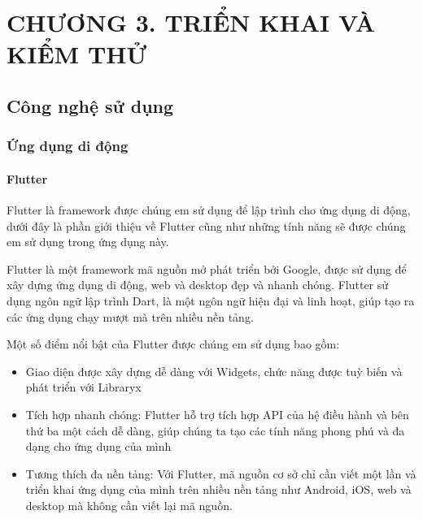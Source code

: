 
\section*{CHƯƠNG 3. TRIỂN KHAI VÀ KIỂM THỬ}
\setcounter{section}{3}
\setcounter{subsection}{0} %
\setcounter{table}{0} %
\setcounter{figure}{0} %

\subsection{Công nghệ sử dụng}
\subsubsection{Ứng dụng di động}

\paragraph{Flutter}
\mbox{}

Flutter là framework được chúng em sử dụng để lập trình cho ứng dụng di động, dưới đây là phần giới thiệu về Flutter cũng
như những tính năng sẽ được chúng em sử dụng trong ứng dụng này.

Flutter là một framework mã nguồn mở phát triển bởi Google, được sử dụng để xây dựng ứng dụng di động, web và desktop đẹp và nhanh chóng. Flutter sử dụng ngôn ngữ lập trình Dart, là một ngôn ngữ hiện đại và linh hoạt, giúp tạo ra các ứng dụng chạy mượt mà trên nhiều nền tảng.

Một số điểm nổi bật của Flutter được chúng em sử dụng bao gồm:

\begin{itemize}
  \item Giao diện được xây dựng dễ dàng với Widgets, chức năng được tuỳ biến và phát triển với Libraryx
  \item Tích hợp nhanh chóng: Flutter hỗ trợ tích hợp API của hệ điều hành và bên thứ ba một cách dễ dàng, giúp chúng ta tạo các tính năng phong phú và đa dạng cho ứng dụng của mình
  \item Tương thích đa nền tảng: Với Flutter, mã nguồn cơ sở chỉ cần viết một lần và triển khai ứng dụng của mình trên nhiều nền tảng như Android, iOS, web và desktop mà không cần viết lại mã nguồn.
\end{itemize}

